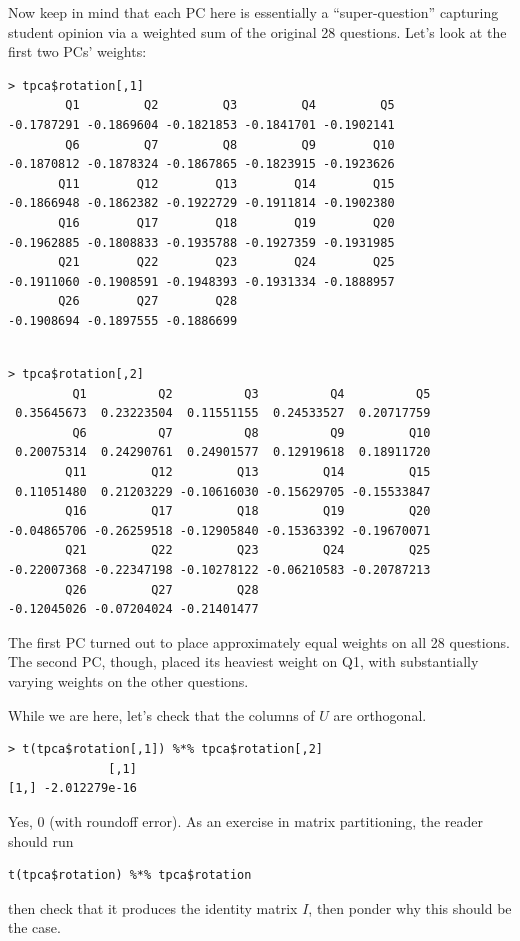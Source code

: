 Now keep in mind that each PC here is essentially a ``super-question''
capturing student opinion via a weighted sum of the original 28
questions.  Let's look at the first two PCs' weights:

\begin{lstlisting}
> tpca$rotation[,1]
        Q1         Q2         Q3         Q4         Q5 
-0.1787291 -0.1869604 -0.1821853 -0.1841701 -0.1902141 
        Q6         Q7         Q8         Q9        Q10 
-0.1870812 -0.1878324 -0.1867865 -0.1823915 -0.1923626 
       Q11        Q12        Q13        Q14        Q15 
-0.1866948 -0.1862382 -0.1922729 -0.1911814 -0.1902380 
       Q16        Q17        Q18        Q19        Q20 
-0.1962885 -0.1808833 -0.1935788 -0.1927359 -0.1931985 
       Q21        Q22        Q23        Q24        Q25 
-0.1911060 -0.1908591 -0.1948393 -0.1931334 -0.1888957 
       Q26        Q27        Q28 
-0.1908694 -0.1897555 -0.1886699 
\end{lstlisting}

\begin{lstlisting}

> tpca$rotation[,2]
         Q1          Q2          Q3          Q4          Q5 
 0.35645673  0.23223504  0.11551155  0.24533527  0.20717759 
         Q6          Q7          Q8          Q9         Q10 
 0.20075314  0.24290761  0.24901577  0.12919618  0.18911720 
        Q11         Q12         Q13         Q14         Q15 
 0.11051480  0.21203229 -0.10616030 -0.15629705 -0.15533847 
        Q16         Q17         Q18         Q19         Q20 
-0.04865706 -0.26259518 -0.12905840 -0.15363392 -0.19670071 
        Q21         Q22         Q23         Q24         Q25 
-0.22007368 -0.22347198 -0.10278122 -0.06210583 -0.20787213 
        Q26         Q27         Q28 
-0.12045026 -0.07204024 -0.21401477 
\end{lstlisting}

The first PC turned out to place approximately equal weights on all 28
questions.  The second PC, though, placed its heaviest weight on Q1,
with substantially varying weights on the other questions.

While we are here, let's check that the columns of $U$ are orthogonal.

\begin{lstlisting}
> t(tpca$rotation[,1]) %*% tpca$rotation[,2]
              [,1]
[1,] -2.012279e-16
\end{lstlisting}

Yes, 0 (with roundoff error).  As an exercise in matrix partitioning,
the reader should run

\begin{lstlisting}
t(tpca$rotation) %*% tpca$rotation
\end{lstlisting}

then check that it produces the identity matrix $I$, then ponder why
this should be the case.
